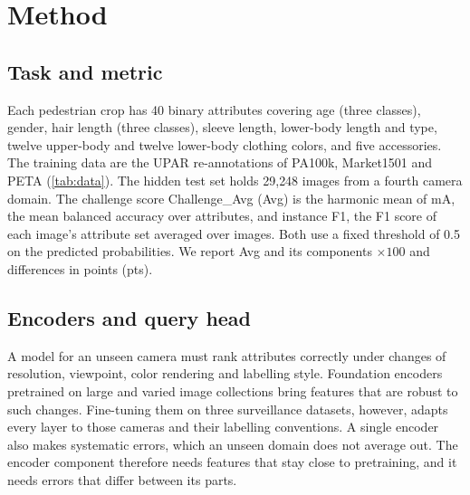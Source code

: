 \documentclass[10pt,twocolumn,letterpaper]{article}
\begin{document}
\section{Method}
\label{sec:method}

\subsection{Task and metric}
\label{sec:task}

Each pedestrian crop has 40 binary attributes covering age (three classes), gender, hair length (three classes), sleeve length, lower-body length and type, twelve upper-body and twelve lower-body clothing colors, and five accessories. The training data are the UPAR re-annotations of PA100k, Market1501 and PETA (\cref{tab:data}). The hidden test set holds 29{,}248 images from a fourth camera domain. The challenge score Challenge\_Avg (Avg) is the harmonic mean of mA, the mean balanced accuracy over attributes, and instance F1, the F1 score of each image's attribute set averaged over images. Both use a fixed threshold of 0.5 on the predicted probabilities. We report Avg and its components $\times100$ and differences in points (pts).

\begin{table}[t]
\centering\small
\setlength{\tabcolsep}{3pt}
\caption{Training data of UPAR 2027 Track~1.}
\label{tab:data}
\end{table}

\subsection{Encoders and query head}
\label{sec:encoders}

A model for an unseen camera must rank attributes correctly under changes of resolution, viewpoint, color rendering and labelling style. Foundation encoders pretrained on large and varied image collections bring features that are robust to such changes. Fine-tuning them on three surveillance datasets, however, adapts every layer to those cameras and their labelling conventions. A single encoder also makes systematic errors, which an unseen domain does not average out. The encoder component therefore needs features that stay close to pretraining, and it needs errors that differ between its parts.
\end{document}
